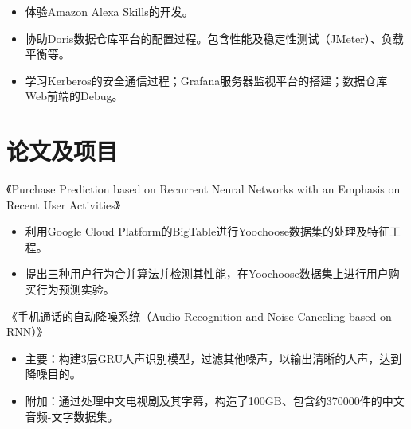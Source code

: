 \documentclass{resume}
\begin{document}
\begin{itemize}
  \item 体验Amazon Alexa Skills的开发。
\end{itemize}

\begin{itemize}
  \item 协助Doris数据仓库平台的配置过程。包含性能及稳定性测试（JMeter）、负载平衡等。
  \item 学习Kerberos的安全通信过程；Grafana服务器监视平台的搭建；数据仓库Web前端的Debug。
\end{itemize}


\section{论文及项目}
《Purchase Prediction based on Recurrent Neural Networks with an Emphasis on Recent User Activities》
\begin{itemize}
  \item 利用Google Cloud Platform的BigTable进行Yoochoose数据集的处理及特征工程。
  \item 提出三种用户行为合并算法并检测其性能，在Yoochoose数据集上进行用户购买行为预测实验。
\end{itemize}

《手机通话的自动降噪系统（Audio Recognition and Noise-Canceling based on RNN）》
\begin{itemize}
  \item 主要：构建3层GRU人声识别模型，过滤其他噪声，以输出清晰的人声，达到降噪目的。
  \item 附加：通过处理中文电视剧及其字幕，构造了100GB、包含约370000件的中文音频-文字数据集。
\end{itemize}
\end{document}
